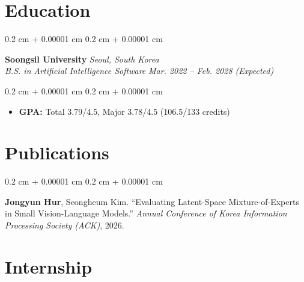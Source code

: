 \documentclass[10pt, letterpaper]{article}
\newenvironment{highlights}{
    \begin{itemize}[
        topsep=0.10 cm,
        parsep=0.10 cm,
        partopsep=0pt,
        itemsep=0pt,
        leftmargin=0.4 cm + 10pt
    ]
}{
    \end{itemize}
}
\newenvironment{onecolentry}{
    \begin{adjustwidth}{
        0.2 cm + 0.00001 cm
    }{
        0.2 cm + 0.00001 cm
    }
}{
    \end{adjustwidth}
}
\begin{document}
    \vspace{0.1cm}


    \section{Education}

        \begin{onecolentry}
            \textbf{Soongsil University}
            \hfill
            \textit{Seoul, South Korea}
            \\
            \textit{B.S. in Artificial Intelligence Software}
            \hfill
            \textit{Mar. 2022 -- Feb. 2028 (Expected)}
        \end{onecolentry}

        \vspace{0.10cm}

        \begin{onecolentry}
            \begin{highlights}
                \item \textbf{GPA:} Total 3.79/4.5, Major 3.78/4.5
                (106.5/133 credits)
            \end{highlights}
        \end{onecolentry}


    \section{Publications}

        \begin{onecolentry}
            \textbf{Jongyun Hur}, Seongheum Kim.
            ``Evaluating Latent-Space Mixture-of-Experts in Small
            Vision-Language Models.''
            \textit{Annual Conference of Korea Information Processing
            Society (ACK)}, 2026.
        \end{onecolentry}


    \section{Internship}
\end{document}
